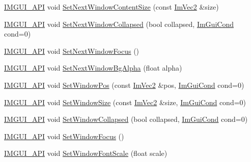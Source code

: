 \begin{DoxyCompactItemize}
\item 
\mbox{\hyperlink{imgui_8h_a43829975e84e45d1149597467a14bbf5}{I\+M\+G\+U\+I\+\_\+\+A\+PI}} void \mbox{\hyperlink{namespace_im_gui_aae55a58c38d8e84b10eb1e8b1531372d}{Set\+Next\+Window\+Content\+Size}} (const \mbox{\hyperlink{struct_im_vec2}{Im\+Vec2}} \&size)
\item 
\mbox{\hyperlink{imgui_8h_a43829975e84e45d1149597467a14bbf5}{I\+M\+G\+U\+I\+\_\+\+A\+PI}} void \mbox{\hyperlink{namespace_im_gui_a3e9380e253a3c49665a404e56950a52a}{Set\+Next\+Window\+Collapsed}} (bool collapsed, \mbox{\hyperlink{imgui_8h_aef890d6ac872e12c5804d0b3e4f7f103}{Im\+Gui\+Cond}} cond=0)
\item 
\mbox{\hyperlink{imgui_8h_a43829975e84e45d1149597467a14bbf5}{I\+M\+G\+U\+I\+\_\+\+A\+PI}} void \mbox{\hyperlink{namespace_im_gui_ac2d2b163c95cd8c8391aba85bc50d170}{Set\+Next\+Window\+Focus}} ()
\item 
\mbox{\hyperlink{imgui_8h_a43829975e84e45d1149597467a14bbf5}{I\+M\+G\+U\+I\+\_\+\+A\+PI}} void \mbox{\hyperlink{namespace_im_gui_a7de5a63cec4babe417f972403db6430c}{Set\+Next\+Window\+Bg\+Alpha}} (float alpha)
\item 
\mbox{\hyperlink{imgui_8h_a43829975e84e45d1149597467a14bbf5}{I\+M\+G\+U\+I\+\_\+\+A\+PI}} void \mbox{\hyperlink{namespace_im_gui_aaa81e004de4c0a5cedb836e92e8aa0e5}{Set\+Window\+Pos}} (const \mbox{\hyperlink{struct_im_vec2}{Im\+Vec2}} \&pos, \mbox{\hyperlink{imgui_8h_aef890d6ac872e12c5804d0b3e4f7f103}{Im\+Gui\+Cond}} cond=0)
\item 
\mbox{\hyperlink{imgui_8h_a43829975e84e45d1149597467a14bbf5}{I\+M\+G\+U\+I\+\_\+\+A\+PI}} void \mbox{\hyperlink{namespace_im_gui_a657c6cc2246485332f608a5204447ea1}{Set\+Window\+Size}} (const \mbox{\hyperlink{struct_im_vec2}{Im\+Vec2}} \&size, \mbox{\hyperlink{imgui_8h_aef890d6ac872e12c5804d0b3e4f7f103}{Im\+Gui\+Cond}} cond=0)
\item 
\mbox{\hyperlink{imgui_8h_a43829975e84e45d1149597467a14bbf5}{I\+M\+G\+U\+I\+\_\+\+A\+PI}} void \mbox{\hyperlink{namespace_im_gui_ab5445711a74e0e1a58d1e464cdda252f}{Set\+Window\+Collapsed}} (bool collapsed, \mbox{\hyperlink{imgui_8h_aef890d6ac872e12c5804d0b3e4f7f103}{Im\+Gui\+Cond}} cond=0)
\item 
\mbox{\hyperlink{imgui_8h_a43829975e84e45d1149597467a14bbf5}{I\+M\+G\+U\+I\+\_\+\+A\+PI}} void \mbox{\hyperlink{namespace_im_gui_ac71920931ed7b7c8594ee84c6a94e7b8}{Set\+Window\+Focus}} ()
\item 
\mbox{\hyperlink{imgui_8h_a43829975e84e45d1149597467a14bbf5}{I\+M\+G\+U\+I\+\_\+\+A\+PI}} void \mbox{\hyperlink{namespace_im_gui_a11f2f343dbc9b00ccd9e99ebd59cfe8b}{Set\+Window\+Font\+Scale}} (float scale)

\end{DoxyCompactItemize}

